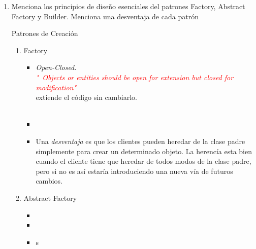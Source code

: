 \documentclass[a4paper,10pt]{article}
\begin{document}
\begin{enumerate}
    
    \item Menciona los principios de diseño esenciales del patrones Factory, Abstract Factory y Builder. Menciona una desventaja de cada patrón 
    
    Patrones de Creación 

        \begin{enumerate}
            \item \colorbox[rgb]{0.53, 0.81, 0.98}{Factory}
            \begin{itemize}
                \item [\Checkmark] \textit{Open-Closed.} \\
                \textcolor{red}{\textit{ "\ Objects or entities should be open for extension but closed for modification"}}\\
                 extiende el código sin cambiarlo.\\\\

                 \item [\Checkmark]
                     
                \item [\XSolidBrush ] Una \textit{desventaja} es que los clientes pueden heredar de la clase padre simplemente para crear un determinado objeto.
                      La herencía esta bien cuando el cliente tiene que heredar de todos modos de la clase padre, pero si no es así estaría introduciendo una
                      nueva vía de futuros cambios. \\
                      
            \end{itemize}

            
            \item \colorbox[rgb]{1.0, 0.71, 0.76}{Abstract Factory}
            \begin{itemize}
                \item [\Checkmark]
                
                \item [\Checkmark]
                      
                      

                \item [\XSolidBrush ] s
                       
            \end{itemize}  
            


\end{enumerate}
\end{enumerate}
\end{document}
